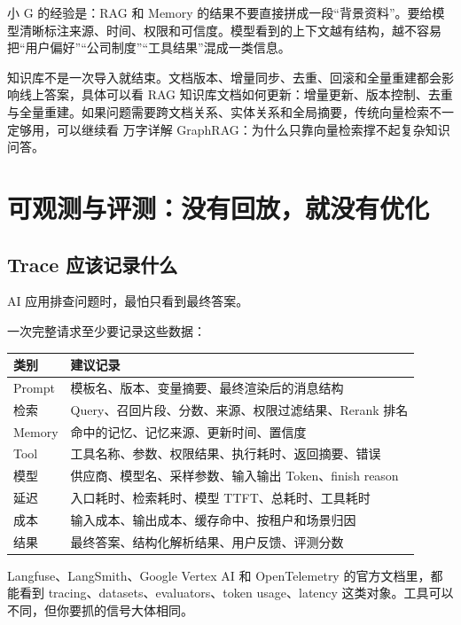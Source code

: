 \documentclass[10pt,a4paper]{ctexart}
\begin{document}
小 G 的经验是：RAG 和 Memory 的结果不要直接拼成一段“背景资料”。要给模型清晰标注来源、时间、权限和可信度。模型看到的上下文越有结构，越不容易把“用户偏好”“公司制度”“工具结果”混成一类信息。



知识库不是一次导入就结束。文档版本、增量同步、去重、回滚和全量重建都会影响线上答案，具体可以看 RAG 知识库文档如何更新：增量更新、版本控制、去重与全量重建。如果问题需要跨文档关系、实体关系和全局摘要，传统向量检索不一定够用，可以继续看 万字详解 GraphRAG：为什么只靠向量检索撑不起复杂知识问答。



\section{可观测与评测：没有回放，就没有优化}


\subsection{Trace 应该记录什么}


AI 应用排查问题时，最怕只看到最终答案。



一次完整请求至少要记录这些数据：


{\footnotesize
\begin{tabularx}{\textwidth}{|X|X|}
\hline
\textbf{类别} & \textbf{建议记录} \\
\hline
Prompt & 模板名、版本、变量摘要、最终渲染后的消息结构 \\
\hline
检索 & Query、召回片段、分数、来源、权限过滤结果、Rerank 排名 \\
\hline
Memory & 命中的记忆、记忆来源、更新时间、置信度 \\
\hline
Tool & 工具名称、参数、权限结果、执行耗时、返回摘要、错误 \\
\hline
模型 & 供应商、模型名、采样参数、输入输出 Token、finish reason \\
\hline
延迟 & 入口耗时、检索耗时、模型 TTFT、总耗时、工具耗时 \\
\hline
成本 & 输入成本、输出成本、缓存命中、按租户和场景归因 \\
\hline
结果 & 最终答案、结构化解析结果、用户反馈、评测分数 \\
\hline
\end{tabularx}
}



Langfuse、LangSmith、Google Vertex AI 和 OpenTelemetry 的官方文档里，都能看到 tracing、datasets、evaluators、token usage、latency 这类对象。工具可以不同，但你要抓的信号大体相同。
\end{document}
